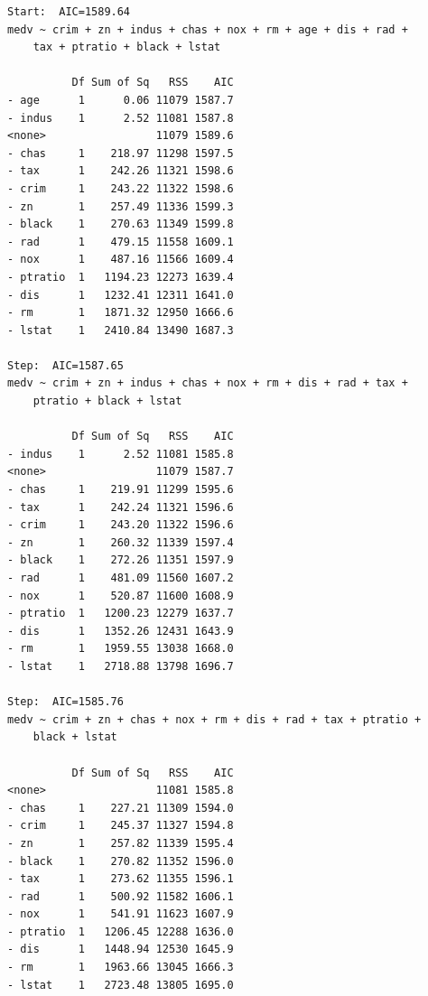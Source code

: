 \documentclass[
  letterpaper,
  DIV=11,
  numbers=noendperiod]{scrreprt}
\begin{document}
\begin{verbatim}
Start:  AIC=1589.64
medv ~ crim + zn + indus + chas + nox + rm + age + dis + rad + 
    tax + ptratio + black + lstat

          Df Sum of Sq   RSS    AIC
- age      1      0.06 11079 1587.7
- indus    1      2.52 11081 1587.8
<none>                 11079 1589.6
- chas     1    218.97 11298 1597.5
- tax      1    242.26 11321 1598.6
- crim     1    243.22 11322 1598.6
- zn       1    257.49 11336 1599.3
- black    1    270.63 11349 1599.8
- rad      1    479.15 11558 1609.1
- nox      1    487.16 11566 1609.4
- ptratio  1   1194.23 12273 1639.4
- dis      1   1232.41 12311 1641.0
- rm       1   1871.32 12950 1666.6
- lstat    1   2410.84 13490 1687.3

Step:  AIC=1587.65
medv ~ crim + zn + indus + chas + nox + rm + dis + rad + tax + 
    ptratio + black + lstat

          Df Sum of Sq   RSS    AIC
- indus    1      2.52 11081 1585.8
<none>                 11079 1587.7
- chas     1    219.91 11299 1595.6
- tax      1    242.24 11321 1596.6
- crim     1    243.20 11322 1596.6
- zn       1    260.32 11339 1597.4
- black    1    272.26 11351 1597.9
- rad      1    481.09 11560 1607.2
- nox      1    520.87 11600 1608.9
- ptratio  1   1200.23 12279 1637.7
- dis      1   1352.26 12431 1643.9
- rm       1   1959.55 13038 1668.0
- lstat    1   2718.88 13798 1696.7

Step:  AIC=1585.76
medv ~ crim + zn + chas + nox + rm + dis + rad + tax + ptratio + 
    black + lstat

          Df Sum of Sq   RSS    AIC
<none>                 11081 1585.8
- chas     1    227.21 11309 1594.0
- crim     1    245.37 11327 1594.8
- zn       1    257.82 11339 1595.4
- black    1    270.82 11352 1596.0
- tax      1    273.62 11355 1596.1
- rad      1    500.92 11582 1606.1
- nox      1    541.91 11623 1607.9
- ptratio  1   1206.45 12288 1636.0
- dis      1   1448.94 12530 1645.9
- rm       1   1963.66 13045 1666.3
- lstat    1   2723.48 13805 1695.0
\end{verbatim}
\end{document}
